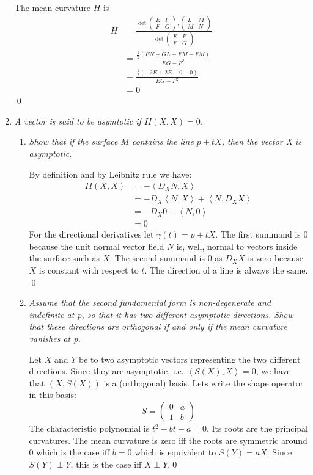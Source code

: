 \documentclass[a4paper,11pt,notitlepage,fullpage]{article}
\newcommand{\la}{\left\langle}
\newcommand{\ra}{\right\rangle}
\newcommand{\EFFG}{\left(\begin{matrix}E&F\\F&G\end{matrix}\right)}
\newcommand{\LMMN}{\left(\begin{matrix}L&M\\M&N\end{matrix}\right)}
\begin{document}
\begin{enumerate}
The mean curvature $H$ is
\begin{align*}
H &= \frac{\det\EFFG, \LMMN}{\det\EFFG} \\
&= \frac{\frac{1}{2}\left(EN + GL - FM - FM\right)}{EG - F^2} \\
&= \frac{\frac{1}{2}\left(-2E+2E-0-0\right)}{EG-F^2} \\
&= 0
\end{align*} 
\qed


\item \emph{A vector is said to be \emph{asymtotic} if $II(X,X) = 0$.}
\begin{enumerate}
\item \emph{Show that if the surface $M$ contains the line $p + tX$, then the vector X is asymptotic.}

By definition and by Leibnitz rule we have:
\begin{align*}
II(X,X) &= -\la D_X N, X \ra \\
&= - D_X \la N,X\ra + \la N, D_X X\ra \\
&= - D_X 0 + \la N, 0 \ra \\
&= 0
\end{align*}
For the directional derivatives let $\gamma(t) = p + tX$. The first summand is 0 because the unit normal vector field $N$ is, well, normal to vectors inside the surface such as $X$. The second summand is 0 as $D_X X$ is zero because $X$ is constant with respect to $t$. The direction of a line is always the same. \qed

\item \emph{Assume that the second fundamental form is non-degenerate and indefinite at p, so that it has two different asymptotic directions. Show that these directions are orthogonal if and only if the mean curvature vanishes at p.}

Let $X$ and $Y$ be to two asymptotic vectors representing the two different directions. Since they are asymptotic, i.e. $\la S(X), X \ra = 0$, we have that $(X, S(X))$ is a (orthogonal) basis. Lets write the shape operator in this basis:
\begin{equation*}
S = \left(\begin{matrix}0&a\\1&b\end{matrix}\right)
\end{equation*}
The characteristic polynomial is $t^2 - bt - a = 0$. Its roots are the principal curvatures. The mean curvature is zero iff the roots are symmetric around $0$ which is the case iff $b = 0$ which is equivalent to $S(Y) = aX$. Since $S(Y) \perp Y$, this is the case iff $X \perp Y$.\qed
\end{enumerate}



\end{enumerate}
\end{document}

